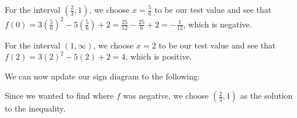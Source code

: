 \documentclass[noauthor, nooutcomes]{ximera}
\begin{document}
\begin{explanation}
For the interval $\left(\frac{2}{3}, 1\right)$, we choose $x = \frac{5}{6}$ to be our test value and see that $f(0) = 3\left(\frac{5}{6}\right)^2 - 5\left(\frac{5}{6}\right) + 2 = \frac{25}{12} - \frac{25}{6} + 2 = -\frac{1}{12}$, which is negative. 

For the interval $\left(1, \infty\right)$, we choose $x = 2$ to be our test value and see that $f(2) = 3(2)^2 - 5(2) + 2 = 4$, which is positive. 

We can now update our sign diagram to the following:
\begin{image}
\end{image}

Since we wanted to find where $f$ was negative, we choose $\left(\frac{2}{3}, 1\right)$ as the solution to the inequality.
\end{explanation}
\end{document}
